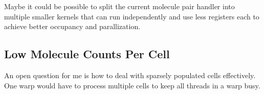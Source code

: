 Maybe it could be possible to split the current molecule pair handler into multiple smaller kernels that can run independently and use less registers each to achieve better occupancy and parallization.

\subsection{Low Molecule Counts Per Cell}
An open question for me is how to deal with sparsely populated cells effectively. One warp would have to process multiple cells to keep all threads in a warp busy.